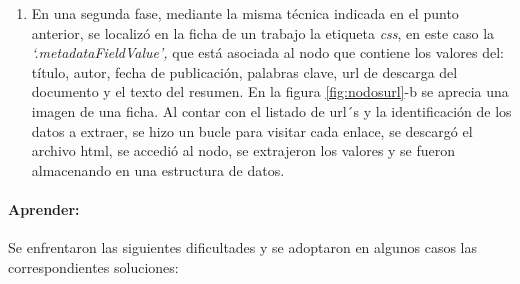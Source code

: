 \documentclass[
  12pt,
  openany]{book}
\providecommand{\tightlist}{%
  \setlength{\itemsep}{0pt}\setlength{\parskip}{0pt}}
\begin{document}
\begin{enumerate}
\def\labelenumi{\arabic{enumi}.}
\setcounter{enumi}{1}
\tightlist
\item
  En una segunda fase, mediante la misma técnica indicada en el punto anterior, se localizó en la ficha de un trabajo la etiqueta \emph{css}, en este caso la \emph{`.metadataFieldValue',} que está asociada al nodo que contiene los valores del: título, autor, fecha de publicación, palabras clave, url de descarga del documento y el texto del resumen. En la figura \ref{fig:nodosurl}-b se aprecia una imagen de una ficha. Al contar con el listado de url´s y la identificación de los datos a extraer, se hizo un bucle para visitar cada enlace, se descargó el archivo html, se accedió al nodo, se extrajeron los valores y se fueron almacenando en una estructura de datos.
\end{enumerate}

\hypertarget{aprender}{%
\paragraph{Aprender:}\label{aprender}}

Se enfrentaron las siguientes dificultades y se adoptaron en algunos casos las correspondientes soluciones:
\end{document}
